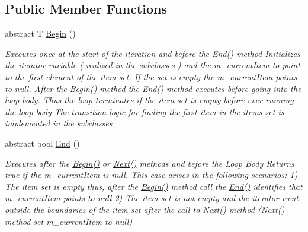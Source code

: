 \subsection*{Public Member Functions}
\begin{DoxyCompactItemize}
\item 
abstract T \hyperlink{class_graph_library_1_1_abstract_graph_iterator_acf5701dde84f76b34a8c2e1d49fa9597}{Begin} ()
\begin{DoxyCompactList}\small\item\em Executes once at the start of the iteration and before the \hyperlink{class_graph_library_1_1_abstract_graph_iterator_a77e657620d4949f79970ce536e0d2bde}{End()} method Initializes the iterator variable ( realized in the subclasses ) and the m\+\_\+current\+Item to point to the first element of the item set. If the set is empty the m\+\_\+current\+Item points to null. After the \hyperlink{class_graph_library_1_1_abstract_graph_iterator_acf5701dde84f76b34a8c2e1d49fa9597}{Begin()} method the \hyperlink{class_graph_library_1_1_abstract_graph_iterator_a77e657620d4949f79970ce536e0d2bde}{End()} method executes before going into the loop body. Thus the loop terminates if the item set is empty before ever running the loop body The transition logic for finding the first item in the items set is implemented in the subclasses \end{DoxyCompactList}\item 
abstract bool \hyperlink{class_graph_library_1_1_abstract_graph_iterator_a77e657620d4949f79970ce536e0d2bde}{End} ()
\begin{DoxyCompactList}\small\item\em Executes after the \hyperlink{class_graph_library_1_1_abstract_graph_iterator_acf5701dde84f76b34a8c2e1d49fa9597}{Begin()} or \hyperlink{class_graph_library_1_1_abstract_graph_iterator_a93e91fb82d0db03016fb1aef9231365e}{Next()} methods and before the Loop Body Returns true if the m\+\_\+current\+Item is null. This case arises in the following scenarios\+: 1) The item set is empty thus, after the \hyperlink{class_graph_library_1_1_abstract_graph_iterator_acf5701dde84f76b34a8c2e1d49fa9597}{Begin()} method call the \hyperlink{class_graph_library_1_1_abstract_graph_iterator_a77e657620d4949f79970ce536e0d2bde}{End()} identifies that m\+\_\+current\+Item points to null 2) The item set is not empty and the iterator went outside the boundaries of the item set after the call to \hyperlink{class_graph_library_1_1_abstract_graph_iterator_a93e91fb82d0db03016fb1aef9231365e}{Next()} method (\hyperlink{class_graph_library_1_1_abstract_graph_iterator_a93e91fb82d0db03016fb1aef9231365e}{Next()} method set m\+\_\+current\+Item to null) \end{DoxyCompactList}\item 

\end{DoxyCompactItemize}
